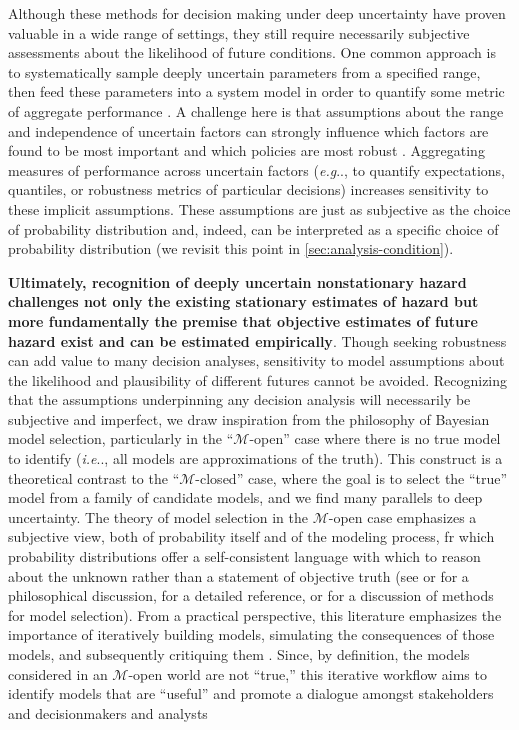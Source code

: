 \documentclass[11pt]{article}
\makeatletter
\DeclareRobustCommand\onedot{\futurelet\@let@token\@onedot}
\def\@onedot{\ifx\@let@token.\else.\null\fi\xspace}
\def\eg{\emph{e.g}\onedot} \def\Eg{\emph{E.g}\onedot}
\def\ie{\emph{i.e}\onedot} \def\Ie{\emph{I.e}\onedot}
\DeclareRobustCommand\onedot{\futurelet\@let@token\@onedot}
\def\@onedot{\ifx\@let@token.\else.\null\fi\xspace}
\def\eg{\emph{e.g}\onedot} \def\Eg{\emph{E.g}\onedot}
\def\ie{\emph{i.e}\onedot} \def\Ie{\emph{I.e}\onedot}
\makeatother
\begin{document}
Although these methods for decision making under deep uncertainty have proven valuable in a wide range of settings, they still require necessarily subjective assessments about the likelihood of future conditions.
One common approach is to systematically sample deeply uncertain parameters from a specified range, then feed these parameters into a system model in order to quantify some metric of aggregate performance \citep{herman:2015,mcphail_robustness:2019,hall_comparison:2012,lempert:2007}.
A challenge here is that assumptions about the range and independence of uncertain factors can strongly influence which factors are found to be most important and which policies are most robust \citep{quinn_exploratory:2020}.
Aggregating measures of performance across uncertain factors (\eg, to quantify expectations, quantiles, or robustness metrics of particular decisions) increases sensitivity to these implicit assumptions.
These assumptions are just as subjective as the choice of probability distribution \citep{schneider_scenarios:2002} and, indeed, can be interpreted  as a specific choice of probability distribution (we revisit this point in \cref{sec:analysis-condition}).

\textbf{Ultimately, recognition of deeply uncertain nonstationary hazard challenges not only the existing stationary estimates of hazard but more fundamentally the premise that objective estimates of future hazard exist and can be estimated empirically}.
Though seeking robustness can add value to many decision analyses, sensitivity to model assumptions about the likelihood and plausibility of different futures cannot be avoided.
Recognizing that the assumptions underpinning any decision analysis will necessarily be subjective and imperfect, we draw inspiration from the philosophy of Bayesian model selection, particularly in the ``$\mathcal{M}$-open'' case where there is no true model to identify (\ie, all models are approximations of the truth).
This construct is a theoretical contrast to the ``$\mathcal{M}$-closed'' case, where the goal is to select the ``true'' model from a family of candidate models, and we find many parallels to deep uncertainty.
The theory of model selection in the $\mathcal{M}$-open case emphasizes a subjective view, both of probability itself and of the modeling process, fr which probability distributions offer a self-consistent language with which to reason about the unknown rather than a statement of objective truth (see \cite{gelman_philosophy:2013} or \cite{ramsey_probability:2016} for a philosophical discussion, \cite{jaynes_probability:2003} for a detailed reference, or \cite{Piironen:2017eh} for a discussion of methods for model selection).
From a practical perspective, this literature emphasizes the importance of iteratively building models, simulating the consequences of those models, and subsequently critiquing them \citep{gelman_workflow:2020}.
Since, by definition, the models considered in an $\mathcal{M}$-open world are not ``true,'' this iterative workflow aims to identify models that are ``useful'' \citep{Box:1976gu} and promote a dialogue amongst stakeholders and decisionmakers and analysts \citep{gelman_philosophy:2013}
\end{document}
